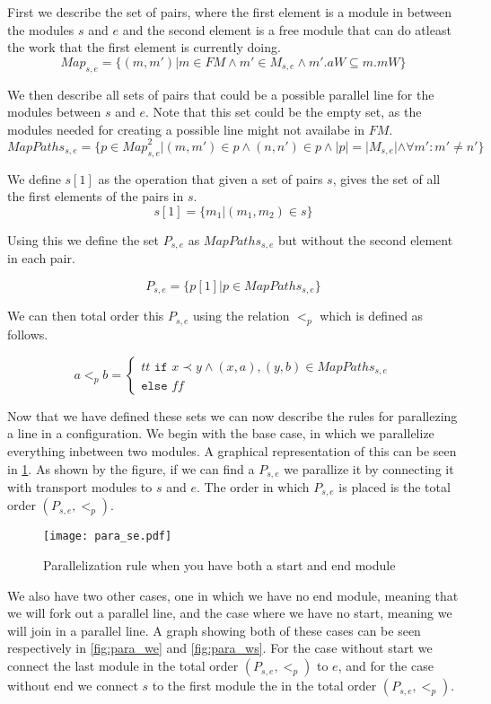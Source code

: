 First we describe the set of pairs, where the first element is a module in between the modules $s$ and $e$ and the second element is a free module that can do atleast the work that the first element is currently doing.
\[Map_{s, e} = \{(m, m')| m \in FM \land m' \in M_{s,e} \land m'.aW \subseteq m.mW\} \]


We then describe all sets of pairs that could be a possible parallel line for the modules between $s$ and $e$. Note that this set could be the empty set, as the modules needed for creating a possible line might not availabe in $FM$.
\[MapPaths_{s,e} = \{p \in {Map}_{s,e}^2 | (m,m') \in p \land (n,n') \in p \land |p| = |M_{s,e}| \land  \forall m': m' \neq n' \}\]

We define $s[1]$ as the operation that given a set of pairs $s$, gives the set of all the first elements of the pairs in $s$.
\[s[1] = \{m_1 | (m_1, m_2) \in s\}\]

Using this we define the set $P_{s,e}$ as $MapPaths_{s,e}$ but without the second element in each pair.

\[ P_{s,e} = \{p[1] | p \in MapPaths_{s,e}\}\]

We can then total order this $P_{s,e}$ using the relation $<_p$ which is defined as follows.

\[a <_{p} b = 
\left\{\begin{matrix}
tt \texttt{ if } x \prec y \land (x, a), (y, b) \in MapPaths_{s,e}\\
\texttt{else } ff
\end{matrix}\right.\]

Now that we have defined these sets we can now describe the rules for parallezing a line in a configuration. We begin with the base case, in which we parallelize everything inbetween two modules. A graphical representation of this can be seen in \cref{fig:para_se}. As shown by the figure, if we can find a $P_{s,e}$ we parallize it by connecting it with transport modules to $s$ and $e$. The order in which $P_{s,e}$ is placed is the total order $(P_{s,e},<_p)$. 

\begin{figure}[h]
\centering
\texttt{[image: para\_se.pdf]}
\caption{Parallelization rule when you have both a start and end module}
\label{fig:para_se}
\end{figure}


We also have two other cases, one in which we have no end module, meaning that we will fork out a parallel line, and the case where we have no start, meaning we will join in a parallel line. A graph showing both of these cases can be seen respectively in \cref{fig:para_we} and \cref{fig:para_ws}. For the case without start we connect the last module in the total order $(P_{s,e}, <_p)$ to $e$, and for the case without end we connect $s$ to the first module the in the total order $(P_{s,e}, <_p)$.



